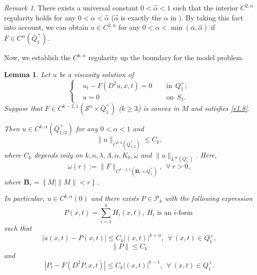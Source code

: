 \documentclass[preprint,12pt]{elsarticle}
\newtheorem{lemma}[theorem]{Lemma}
\theoremstyle{definition}
\theoremstyle{remark}
\newtheorem{remark}[theorem]{Remark}
\numberwithin{equation}{section}
\begin{document}
\begin{remark}\label{re.Cka.UtB.2}
There exists a universal constant $0<\hat{\alpha}<1$ such that the interior $C^{2,\alpha}$ regularity holds for any $0<\alpha<\hat{\alpha}$ ($\hat \alpha$ is exactly the $\alpha$ in \cite[Theorem 4.13]{MR1139064}). By taking this fact into account, we can obtain $u\in C^{2,\alpha}$ for any $0<\alpha<\min (\bar{\alpha},\hat{\alpha})$ if $F\in C^{\alpha}(\bar{Q}_1^+)$.
\end{remark}

Now, we establish the $C^{k,\alpha}$ regularity up the boundary for the model problem.

\begin{lemma}\label{L.Cka.F0}
Let $u$ be a viscosity solution of
\begin{equation*}
\left\{\begin{aligned}
&u_t-F(D^2u,x,t)=0&& ~~\mbox{in}~~Q_1^+;\\
&u=0&& ~~\mbox{on}~~S_1.
\end{aligned}\right.
\end{equation*}
Suppose that $F\in C^{k-2,1}(\mathcal{S}^{n}\times \bar Q^+_1)$ ($k\geq 3$) is convex in $M$ and satisfies \cref{e1.8}.

Then $u\in C^{k,\alpha}(\bar{Q}^+_{1/2})$ for any $0<\alpha<1$ and
\begin{equation*}
\|u\|_{C^{k,\alpha}(\bar{Q}^+_{1/2})}\leq C_k,
\end{equation*}
where $C_k$ depends only on $k,n,\lambda, \Lambda,\alpha,K_0,\omega$ and $\|u\|_{L^{\infty }(Q_1^+)}$. Here,
\begin{equation*}
\omega(r):=\|F\|_{C^{k-2,1}(\bar{\textbf{B}}_r\times \bar Q_{1}^{+})},~~\forall ~r>0,
\end{equation*}
where $\textbf{B}_r=\left\{M\big| \|M\|<r\right\}$.

In particular, $u\in C^{k,\alpha}(0)$ and there exists $P\in \mathcal{P}_k$ with the following expression
\begin{equation}\label{e4.3}
P(x,t)=\sum_{i=1}^{k}H_i(x,t),~H_i \mbox{ is an } i\mbox{-form }
\end{equation}
such that
\begin{equation}\label{e.l62-1}
  |u(x,t)-P(x,t)|\leq C_k |(x,t)|^{k+\alpha}, ~~\forall ~(x,t)\in Q_{1}^+,
\end{equation}
\begin{equation}\label{e.l62-3}
  \|P\|\leq C_k
\end{equation}
and
\begin{equation}\label{e.l62-2}
  |P_t-F(D^2P,x,t)|\leq C_k |(x,t)|^{k-1}, ~~\forall ~(x,t)\in Q_{1}^+.
\end{equation}
\end{lemma}
\end{document}
